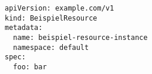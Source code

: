\begin{verbatim}
apiVersion: example.com/v1
kind: BeispielResource
metadata:
  name: beispiel-resource-instance
  namespace: default
spec:
  foo: bar
\end{verbatim}
